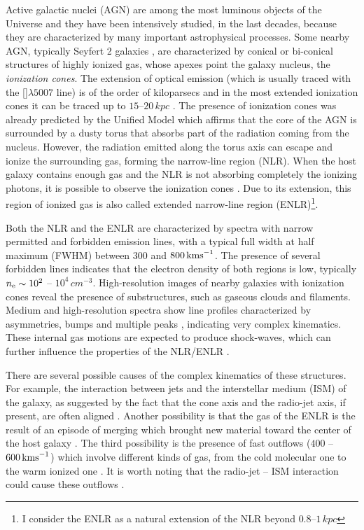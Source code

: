 \documentclass[../main.tex]{subfiles}
\begin{document}
Active galactic nuclei (AGN) are among the most luminous objects of the Universe and they have been intensively studied, in the last decades, because they are characterized by many important astrophysical processes.
Some nearby AGN, typically Seyfert 2 galaxies \citep[$\sim 50$ up to $z\sim 0.05$,][]{Netzer15}, are characterized by conical or bi-conical structures of highly ionized gas, whose apexes point the galaxy nucleus, the \emph{ionization cones}.
The extension of optical emission (which is usually traced with the []$\lambda5007$ line) is of the order of kiloparsecs and in the most extended ionization cones it can be traced up to $15$--$20\,\si{kpc}$ \citep{Mulchaey96a,Mulchaey96b,Schmitt03}.
The presence of ionization cones was already predicted by the Unified Model \citep{Antonucci85, Antonucci93} which affirms that the core of the AGN is surrounded by a dusty torus that absorbs part of the radiation coming from the nucleus.
However, the radiation emitted along the torus axis can escape and ionize the surrounding gas, forming the narrow-line region (NLR).
When the host galaxy contains enough gas and the NLR is not absorbing completely the ionizing photons, it is possible to observe the ionization cones \citep{Evans93}.
Due to its extension, this region of ionized gas is also called extended narrow-line region (ENLR)\footnote{I consider the ENLR as a natural extension of the NLR beyond $0.8$--$1\,\si{kpc}$}.

Both the NLR and the ENLR are characterized by spectra with narrow permitted and forbidden emission lines, with a typical full width at half maximum (FWHM) between $300$ and $800\,\si{\kms}$.
The presence of several forbidden lines indicates that the electron density of both regions is low, typically $n_{\rm e} \sim 10^2$ -- $10^4\,\si{cm^{-3}}$.
High-resolution images of nearby galaxies with ionization cones \citep[e.g.][]{Schmitt03} reveal the presence of substructures, such as gaseous clouds and filaments.
Medium and high-resolution spectra show line profiles characterized by asymmetries, bumps and multiple peaks \citep[e.g.][]{Dietrich98,Ozaki09}, indicating very complex kinematics.
These internal gas motions are expected to produce shock-waves, which can further influence the properties of the NLR/ENLR \citep[see e.g.][]{Contini12}.

There are several possible causes of the complex kinematics of these structures.
For example, the interaction between jets and the interstellar medium (ISM) of the galaxy, as suggested by the fact that the cone axis and the radio-jet axis, if present, are often aligned \citep{Unger87, Wilson94, Nagar99, Schmitt03}.
Another possibility is that the gas of the ENLR is the result of an episode of merging which brought new material toward the center of the host galaxy \citep{Veilleux99, Ciroi05, DiMille07, Cracco11}.
The third possibility is the presence of fast outflows ($400$ -- $600\,\si{\kms}$) which involve different kinds of gas, from the cold molecular one to the warm ionized one \citep{Baldwin87,Morganti15,Dasyra15}.
It is worth noting that the radio-jet -- ISM interaction could cause these outflows \citep{Tadhunter14,Morganti15,Dasyra15}. 
\end{document}
